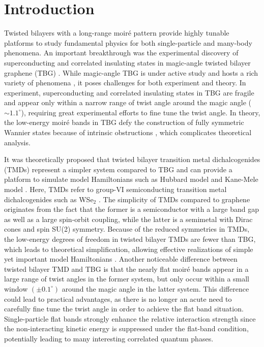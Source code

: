 \documentclass[aps,prx,floatfix,twocolumn]{revtex4-1}
\begin{document}
	\section{Introduction}\label{sec:intro}
	Twisted bilayers with a long-range moir\'e pattern provide highly tunable platforms to study fundamental physics for both single-particle and many-body phenomena. An important breakthrough was the experimental discovery of superconducting and correlated insulating states \cite{cao2018correlated, cao2018unconventional} in magic-angle twisted bilayer graphene (TBG) \cite{bistritzer2011moire}.  While magic-angle TBG is under active study and hosts a rich variety of phenomena \cite{yankowitz2019tuning,lu2019superconductors,sharpe2019emergent, serlin2020intrinsic}, it poses challenges for both experiment and theory. In experiment, superconducting and correlated insulating states in TBG are fragile and appear only within a narrow range of twist angle around the magic angle ($\sim 1.1^{\circ}$), requiring great experimental efforts to fine tune the twist angle. In theory, the low-energy moir\'e bands in TBG defy the construction of fully symmetric Wannier states because of intrinsic obstructions \cite{po2018origin}, which complicates theoretical analysis.   
	
	It was theoretically proposed that twisted bilayer transition metal dichalcogenides (TMDs) represent a simpler system  compared to TBG and can provide a platform to simulate model Hamiltonians such as Hubbard model and Kane-Mele model \cite{wu2018hubbard, wu2019topological}. Here, TMDs refer to group-VI semiconducting transition metal dichalcogenides such as WSe$_2$ \cite{xiao2012coupled}. The simplicity of TMDs compared to graphene originates from the fact that the former is a semiconductor with a large band gap as well as a large spin-orbit coupling, while the latter is a semimetal with Dirac cones and spin SU(2) symmetry. Because of the reduced symmetries in TMDs, the low-energy degrees of freedom in twisted bilayer TMDs are fewer than TBG, which leads to theoretical simplification, allowing effective realizations of simple yet important model Hamiltonians \cite{wu2018hubbard, wu2019topological}. Another noticeable difference between twisted bilayer TMD and TBG is that the nearly flat moir\'e bands  appear in a large range of twist angles in the former system, but only occur within a small window $(\pm 0.1^{\circ})$ around the magic angle in the latter system. This difference could lead to practical advantages, as there is no longer an acute need to carefully fine tune the twist angle in order to achieve the flat band situation.  Single-particle flat bands strongly enhance the relative interaction strength since the non-interacting kinetic energy is suppressed under the flat-band condition, potentially leading to many interesting correlated quantum phases.
	
\end{document}
